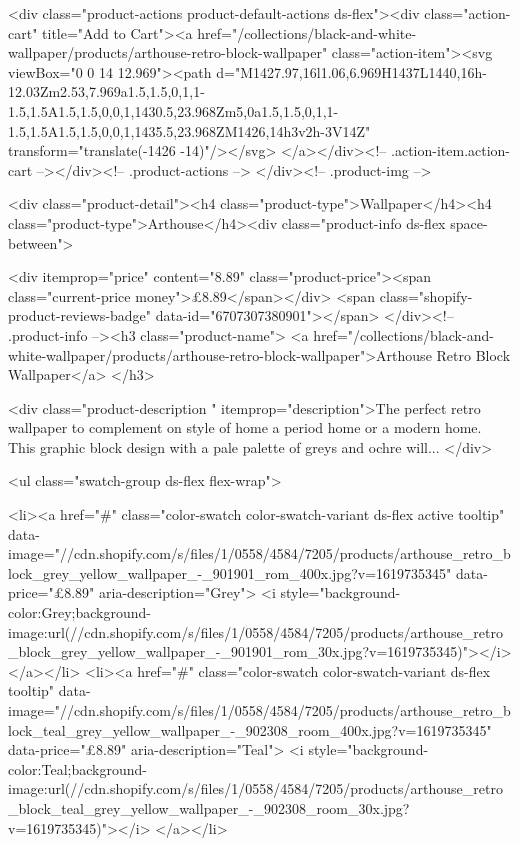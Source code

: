 {{{{{{{<div class="product-actions product-default-actions ds-flex"><div class="action-cart" title="Add to Cart"><a href="/collections/black-and-white-wallpaper/products/arthouse-retro-block-wallpaper" class="action-item"><svg viewBox="0 0 14 12.969"><path d="M1427.97,16l1.06,6.969H1437L1440,16h-12.03Zm2.53,7.969a1.5,1.5,0,1,1-1.5,1.5A1.5,1.5,0,0,1,1430.5,23.968Zm5,0a1.5,1.5,0,1,1-1.5,1.5A1.5,1.5,0,0,1,1435.5,23.968ZM1426,14h3v2h-3V14Z" transform="translate(-1426 -14)"/></svg>
</a></div><!-- .action-item.action-cart --></div><!-- .product-actions -->
</div><!-- .product-img -->

<div class="product-detail"><h4 class="product-type">Wallpaper</h4><h4 class="product-type">Arthouse</h4><div class="product-info ds-flex space-between">
    
<div itemprop="price" content="8.89" class="product-price"><span class="current-price money">£8.89</span></div>
    <span class="shopify-product-reviews-badge" data-id="6707307380901"></span>
  </div><!-- .product-info --><h3 class="product-name">
      <a href="/collections/black-and-white-wallpaper/products/arthouse-retro-block-wallpaper">Arthouse Retro Block Wallpaper</a>
    </h3>
    
<div class="product-description " itemprop="description">The perfect retro wallpaper to complement on style of home a period home or a modern home. This graphic block design with a pale palette of greys and ochre will...
</div>



<ul class="swatch-group ds-flex flex-wrap">
        
<li><a href="#" class="color-swatch color-swatch-variant ds-flex active tooltip" data-image="//cdn.shopify.com/s/files/1/0558/4584/7205/products/arthouse_retro_block_grey_yellow_wallpaper_-_901901_rom_400x.jpg?v=1619735345" data-price="£8.89" aria-description="Grey">
              <i style="background-color:Grey;background-image:url(//cdn.shopify.com/s/files/1/0558/4584/7205/products/arthouse_retro_block_grey_yellow_wallpaper_-_901901_rom_30x.jpg?v=1619735345)"></i>
            </a></li>
<li><a href="#" class="color-swatch color-swatch-variant ds-flex tooltip" data-image="//cdn.shopify.com/s/files/1/0558/4584/7205/products/arthouse_retro_block_teal_grey_yellow_wallpaper_-_902308_room_400x.jpg?v=1619735345" data-price="£8.89" aria-description="Teal">
              <i style="background-color:Teal;background-image:url(//cdn.shopify.com/s/files/1/0558/4584/7205/products/arthouse_retro_block_teal_grey_yellow_wallpaper_-_902308_room_30x.jpg?v=1619735345)"></i>
            </a></li>

}}}}}}}
